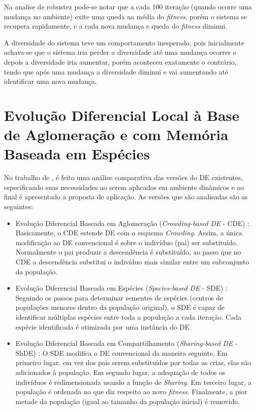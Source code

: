 Na analise de robustez pode-se notar que a cada 100 iteração (quando ocorre uma mudança no ambiente) exite uma queda na média do \textit{fitness}, porém o sistema se recupera rapidamente, e a cada nova mudança e queda do \textit{fitness} diminui.

A diversidade do sistema teve um comportamento inesperado, pois inicialmente achava-se que o sistema iria perder a diversidade até uma mudança ocorrer e depois a diversidade iria aumentar, porém aconteceu exatamente o contrário, tendo que após uma mudança a diversidade diminui e vai aumentando até identificar uma nova mudança.

\section{Evolução Diferencial Local à Base de Aglomeração e com Memória Baseada em Espécies}
\label{sec:crowding_base_de}

No trabalho de \cite{kundu2013crowding}, é feito uma análise comparativa das versões do DE existentes, especificando suas necessidades ao serem aplicados em ambiente dinâmicos e ao final é apresentado a proposta de aplicação. As versões que são analisadas são as seguintes:

\begin{itemize}
\item Evolução Diferencial Baseada em Aglomeração (\textit{Crowding-based DE} - CDE) \cite{thomsen2004multimodal}: Basicamente, o CDE estende DE com o esquema \textit{Crowding}. Assim, a única modificação ao DE convencional é sobre o indivíduo (pai) ser substituído. Normalmente o pai produzir a descendência é substituído, ao passo que no CDE a descendência substitui o indivíduo mais similar entre um subconjunto da população.

\item Evolução Diferencial Baseada em Espécies (\textit{Species-based DE} - SDE) \cite{li2005efficient}: Seguindo os passos para determinar sementes de espécies (centros de populações menores dentro da população original), o SDE é capaz de identificar múltiplas espécies entre toda a população a cada iteração. Cada espécie identificada é otimizada por uma instância do DE.

\item Evolução Diferencial Baseada em Compartilhamento (\textit{Sharing-based DE} - ShDE) \cite{thomsen2004multimodal}: O SDE modifica o DE convencional da maneira seguinte. Em primeiro lugar, em vez dos pais serem substituídos por todas as crias, elas são adicionados à população. Em segundo lugar, a adequação de todos os indivíduos é redimensionada usando a função de \textit{Sharing}. Em terceiro lugar, a população é ordenada no que diz respeito ao novo \textit{fitness}. Finalmente, a pior metade da população (igual ao tamanho da população inicial) é removido.
\end{itemize}

